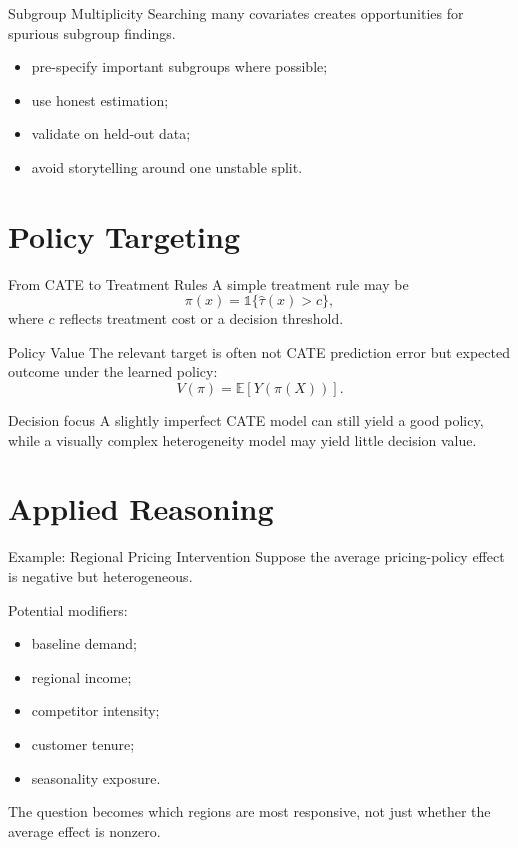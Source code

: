 \documentclass[aspectratio=169,11pt]{beamer}
\newcommand{\E}{\mathbb{E}}
\begin{document}
\begin{frame}{Subgroup Multiplicity}
Searching many covariates creates opportunities for spurious subgroup findings.

\begin{itemize}
\item pre-specify important subgroups where possible;
\item use honest estimation;
\item validate on held-out data;
\item avoid storytelling around one unstable split.
\end{itemize}
\end{frame}

\section{Policy Targeting}

\begin{frame}{From CATE to Treatment Rules}
A simple treatment rule may be
\[
\pi(x)=\mathbb{1}\{\widehat\tau(x)>c\},
\]
where \(c\) reflects treatment cost or a decision threshold.
\end{frame}

\begin{frame}{Policy Value}
The relevant target is often not CATE prediction error but expected outcome under the learned policy:
\[
V(\pi)=\E[Y(\pi(X))].
\]

\begin{alertblock}{Decision focus}
A slightly imperfect CATE model can still yield a good policy, while a visually complex heterogeneity model may yield little decision value.
\end{alertblock}
\end{frame}

\section{Applied Reasoning}

\begin{frame}{Example: Regional Pricing Intervention}
Suppose the average pricing-policy effect is negative but heterogeneous.

Potential modifiers:
\begin{itemize}
\item baseline demand;
\item regional income;
\item competitor intensity;
\item customer tenure;
\item seasonality exposure.
\end{itemize}

The question becomes which regions are most responsive, not just whether the average effect is nonzero.
\end{frame}
\end{document}
